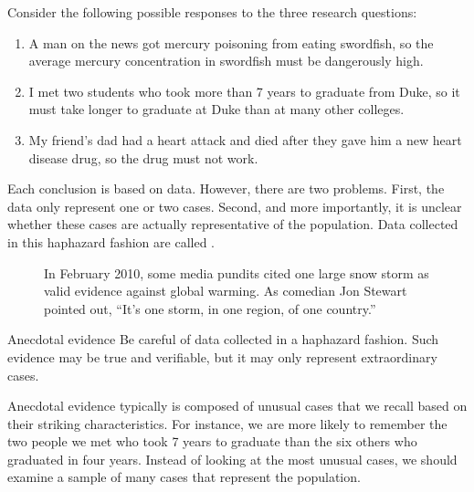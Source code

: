 Consider the following possible responses to the three research questions:
\begin{enumerate}
\item A man on the news got mercury poisoning from eating swordfish, so the average mercury concentration in swordfish must be dangerously high.
\item\label{iKnowThreeStudentsWhoTookMoreThan7YearsToGraduateAtDuke} I met two students who took more than 7 years to graduate from Duke, so it must take longer to graduate at Duke than at many other colleges.
\item\label{myFriendsDadDiedAfterSulphinpyrazon} My friend's dad had a heart attack and died after they gave him a new heart disease drug, so the drug must not work.
\end{enumerate}
Each conclusion is based on data. However, there are two problems. First, the data only represent one or two cases. Second, and more importantly, it is unclear whether these cases are actually representative of the population. Data collected in this haphazard fashion are called .

\setlength{\captionwidth}{\textwidth-80mm}
\begin{figure}
  \centering
  \hspace{8mm}\hspace{4mm}
  \begin{minipage}[b]{\textwidth - 80mm}
    \caption[anecdotal evidence]{In February 2010,
        some media pundits cited one large snow storm
        as valid evidence against global warming.
        As comedian Jon Stewart pointed out,
        ``It's one storm, in one region, of one country.''
    \label{mnWinter}}
  \end{minipage}
\end{figure}
\setlength{\captionwidth}{\mycaptionwidth}

\begin{onebox}{Anecdotal evidence}
Be careful of data collected in a haphazard fashion.
Such evidence may be true and verifiable, but it may
only represent extraordinary cases.
\end{onebox}

Anecdotal evidence typically is composed of unusual cases that we recall based on their striking characteristics. For instance, we are more likely to remember the two people we met who took 7 years to graduate than the six others who graduated in four years. Instead of looking at the most unusual cases, we should examine a sample of many cases that represent the population.

